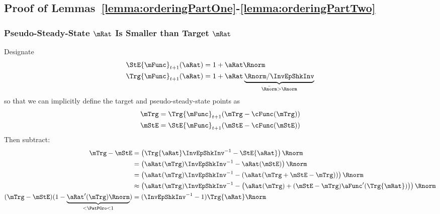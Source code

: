 \documentclass[\econtexRoot/BufferStockTheory]{subfiles}
\begin{document}
\subsection{Proof of Lemmas~\ref{lemma:orderingPartOne}-\ref{lemma:orderingPartTwo}}

\subsubsection{Pseudo-Steady-State $\mRat$ Is Smaller than Target $\mRat$}
Designate
\begin{equation}\begin{split}
  \StE{\mFunc}_{t+1}(\aRat) %
   & = 1+\aRat\Rnorm
\\  \Trg{\mFunc}_{t+1}(\aRat)%
 & = 1+\aRat\underbrace{\Rnorm/\InvEpShkInv}_{\bar{\Rnorm} > \Rnorm}
\end{split}\end{equation}
so that we can implicitly define the target and pseudo-steady-state points as
\begin{equation}\begin{split}
  \mTrg & =\Trg{\mFunc}_{t+1}(\mTrg-\cFunc(\mTrg))
  \\ \mStE & = \StE{\mFunc}_{t+1}(\mStE-\cFunc(\mStE))
\end{split}\end{equation}
Then subtract:
\begin{equation}\begin{split}
  \mTrg - \mStE %
 & = \left(\Trg{\aRat} \InvEpShkInv^{-1} - \StE{\aRat} \right)\Rnorm 
\\ & = \left({\aRat}(\mTrg) \InvEpShkInv^{-1} - {\aRat}(\mStE) \right)\Rnorm 
\\ & = \left({\aRat}(\mTrg) \InvEpShkInv^{-1} - \left({\aRat}(\mTrg+\mStE-\mTrg)\right) \right)\Rnorm 
\\ & \approx \left({\aRat}(\mTrg) \InvEpShkInv^{-1} - \left({\aRat}(\mTrg)+(\mStE-\mTrg)\aFunc^{\prime}(\Trg{\mRat})\right) \right)\Rnorm 
  \\ (\mTrg - \mStE)(1-\underbrace{{\aRat}^{\prime}(\mTrg)\Rnorm}_{< \PatPGro < 1}) & = (\InvEpShkInv^{-1} - 1)\Trg{\aRat}\Rnorm
\end{split}\end{equation}
\end{document}
